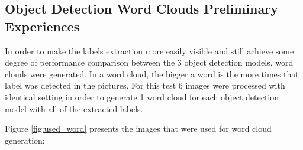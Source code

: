     \subsection{Object Detection Word Clouds Preliminary Experiences}
    \label{ch:wordclouds}
    In order to make the labels extraction more easily visible and still achieve some degree of performance comparison between the 3 object detection models, word clouds were generated. In a word cloud, the bigger a word is the more times that label was detected in the pictures. For this test 6 images were processed with identical setting in order to generate 1 word cloud for each object detection model with all of the extracted labels.

    Figure \ref{fig:used_word} presents the images that were used for word cloud generation:
    
   


